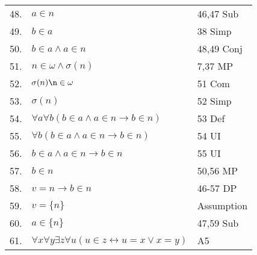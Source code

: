 \documentclass[12pt, a4paper]{article}
\begin{document}
\begin{table}[h!]
\begin{center}
\begin{tabular}{l l l}
        48.& \hspace{30mm}$a\in n$ & 46,47 Sub\\
        
        49.& \hspace{30mm}$b\in a$ & 38 Simp\\
        
        50.& \hspace{30mm}$b\in a\wedge a\in n$ & 48,49 Conj\\
        
        51.& \hspace{30mm}$n\in\omega\wedge\sigma(n)$ & 7,37 MP\\
        
        52.& \hspace{30mm}$\sigma(n)\n\in\omega$ & 51 Com\\
        
        53.& \hspace{30mm}$\sigma(n)$ & 52 Simp\\
        
        54.& \hspace{30mm}$\forall a\forall b(b\in a\wedge a\in n\rightarrow b\in n)$ & 53 Def\\
        
        55.& \hspace{30mm}$\forall b(b\in a\wedge a\in n\rightarrow b\in n)$ & 54 UI\\
        
        56.& \hspace{30mm}$b\in a\wedge a\in n\rightarrow b\in n$ & 55 UI\\
        
        57.& \hspace{30mm}$b\in n$ & 50,56 MP\\
        
        58.& \hspace{20mm}$v=n\rightarrow b\in n$ & 46-57 DP\\
        
        59.& \hspace{20mm}$v=\{n\}$ & Assumption\\
        
        60.& \hspace{30mm}$a\in \{n\}$ & 47,59 Sub\\
        
        61.& \hspace{30mm}$\forall x\forall y\exists z\forall u(u\in z\leftrightarrow u=x\vee x=y)$ & A5\\
        

\end{tabular}
\end{center}
\end{table}
\end{document}
